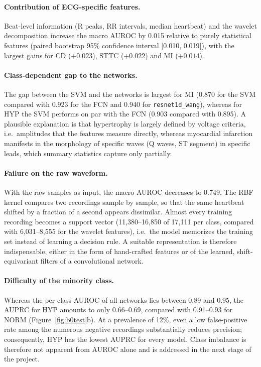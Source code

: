 \documentclass{article}
\newcommand{\wang}{\texttt{resnet1d\_wang}}
\begin{document}
\paragraph{Contribution of ECG-specific features.} Beat-level information (R peaks, RR intervals, median heartbeat) and the wavelet decomposition increase the macro AUROC by 0.015 relative to purely statistical features (paired bootstrap 95\% confidence interval [0.010, 0.019]), with the largest gains for CD ($+0.023$), STTC ($+0.022$) and MI ($+0.014$).

\paragraph{Class-dependent gap to the networks.} The gap between the SVM and the networks is largest for MI (0.870 for the SVM compared with 0.923 for the FCN and 0.940 for \wang{}), whereas for HYP the SVM performs on par with the FCN (0.903 compared with 0.895). A plausible explanation is that hypertrophy is largely defined by voltage criteria, i.e.\ amplitudes that the features measure directly, whereas myocardial infarction manifests in the morphology of specific waves (Q waves, ST segment) in specific leads, which summary statistics capture only partially.

\paragraph{Failure on the raw waveform.} With the raw samples as input, the macro AUROC decreases to 0.749. The RBF kernel compares two recordings sample by sample, so that the same heartbeat shifted by a fraction of a second appears dissimilar. Almost every training recording becomes a support vector (11,380--16,850 of 17,111 per class, compared with 6,031--8,555 for the wavelet features), i.e.\ the model memorizes the training set instead of learning a decision rule. A suitable representation is therefore indispensable, either in the form of hand-crafted features or of the learned, shift-equivariant filters of a convolutional network.

\paragraph{Difficulty of the minority class.} Whereas the per-class AUROC of all networks lies between 0.89 and 0.95, the AUPRC for HYP amounts to only 0.66--0.69, compared with 0.91--0.93 for NORM (Figure~\ref{fig:b0test}b). At a prevalence of 12\%, even a low false-positive rate among the numerous negative recordings substantially reduces precision; consequently, HYP has the lowest AUPRC for every model. Class imbalance is therefore not apparent from AUROC alone and is addressed in the next stage of the project.
\end{document}
